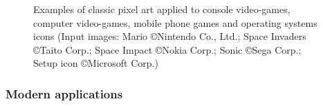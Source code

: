 \documentclass[]{usiinfbachelorproject}
\begin{document}
\begin{figure}[ht]
	\centering
	\caption{Examples of classic pixel art applied to console video-games, computer video-games, mobile phone games and operating systems icons (Input images:  Mario \copyright Nintendo Co., Ltd.;  Space Invaders \copyright Taito Corp.;  Space Impact \copyright Nokia Corp.;  Sonic \copyright Sega Corp.;  Setup icon \copyright Microsoft Corp.)}
	\label{fig:pixelart}
\end{figure}

\subsubsection{Modern applications}
\end{document}
